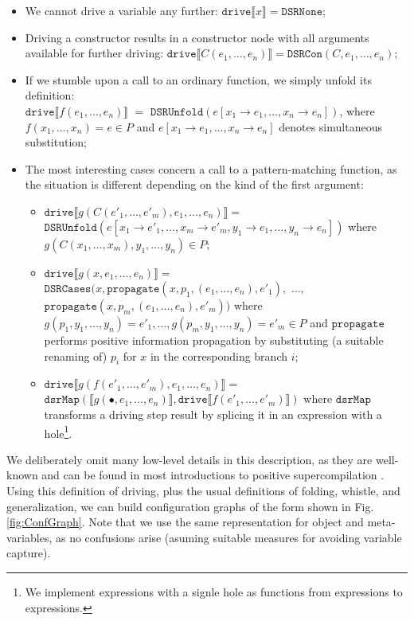 \documentclass[submission,copyright,creativecommons]{eptcs}
\begin{document}
\begin{itemize}
  \item We cannot drive a variable any further: $\mathtt{drive} \llbracket x \rrbracket = \mathtt{DSRNone}$;
  \item Driving a constructor results in a constructor node with all arguments available for
    further driving: $\mathtt{drive} \llbracket C(e_1, \ldots, e_n) \rrbracket = \mathtt{DSRCon}(C, e_1, \ldots, e_n)$;
  \item If we stumble upon a call to an ordinary function, we simply unfold its definition: \\
    $\mathtt{drive} \llbracket f(e_1, \ldots, e_n) \rrbracket$ $=$ $\mathtt{DSRUnfold}(e [ x_1\rightarrow e_1, \ldots, x_n\rightarrow e_n ])$,
    where $f(x_1, \ldots, x_n) = e \in P$ and $e [ x_1\rightarrow e_1, \ldots, x_n\rightarrow e_n ] $
    denotes simultaneous substitution;
  \item The most interesting cases concern a call to a pattern-matching function, as the situation is
    different depending on the kind of the first argument:
    \begin{itemize}
      \item $\mathtt{drive} \llbracket g(C(e'_1, \ldots, e'_m), e_1, \ldots, e_n) \rrbracket =$
        $\mathtt{DSRUnfold}(e [ x_1\rightarrow e'_1, \ldots, x_m\rightarrow e'_m, y_1 \rightarrow e_1, \ldots, y_n \rightarrow e_n ])$
        where $g(C(x_1, \ldots, x_m), y_1, \ldots, y_n) \in P$;
      \item $\mathtt{drive} \llbracket g(x, e_1, \ldots, e_n) \rrbracket =$
        $\mathtt{DSRCases}(x, \mathtt{propagate}(x, p_1, (e_1, \ldots, e_n), e'_1),$ $\ldots,$ \\
          $\mathtt{propagate}(x, p_m, (e_1, \ldots, e_n), e'_m))$
        where $g(p_1, y_1, \ldots, y_n) = e'_1, \ldots, g(p_m, y_1, \ldots, y_n) = e'_m \in P$
        and $\mathtt{propagate}$ performs positive information propagation by substituting (a suitable renaming of) $p_i$ for $x$ 
        in the corresponding branch $i$;
      \item $\mathtt{drive} \llbracket g(f(e'_1, \ldots, e'_m), e_1, \ldots, e_n) \rrbracket =$
        $\mathtt{dsrMap}(\llbracket g(\bullet, e_1, \ldots, e_n) \rrbracket, \mathtt{drive} \llbracket f(e'_1, \ldots, e'_m) \rrbracket)$
        where $\mathtt{dsrMap}$ transforms a driving step result by splicing it in an expression with a hole\footnote{
        We implement expressions with a signle hole as functions from expressions to expressions.}.
    \end{itemize}
\end{itemize}
We deliberately omit many low-level details in this description, as they are well-known and can be found
in most introductions to positive supercompilation \cite{Sorensen1994TurchinSupercompiler,sorm98b,TMR/SCP2014}.
Using this definition of driving, plus the usual definitions of folding, whistle, and generalization, 
we can build configuration graphs of the form shown in Fig. \ref{fig:ConfGraph}.
Note that we use the same representation for object and meta-variables,
as no confusions arise (asuming suitable measures for avoiding variable capture).
\end{document}
